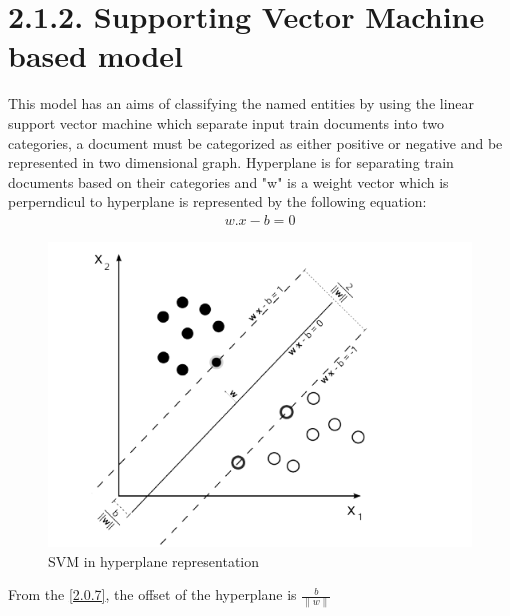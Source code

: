 \section*{2.1.2.  Supporting Vector Machine based model}
This model has an aims of classifying the named entities by using the linear support vector machine which separate input train documents into two categories, a document must be categorized as either positive or negative and be represented in two dimensional graph.
Hyperplane is for separating train documents based on their categories and "w" is a weight vector  which is perperndicul to hyperplane is represented by the following equation: 
\begin{align}
w.x- b = 0 \label{2.0.7}
\end{align}
\begin{figure}[hbtp]
\caption{SVM in hyperplane representation}
\centering
\includegraphics[scale=.7]{images/svm.png}
\end{figure}

 

From the \eqref{2.0.7}, the offset of the hyperplane is $ \frac{b}{\parallel  w \parallel} $

